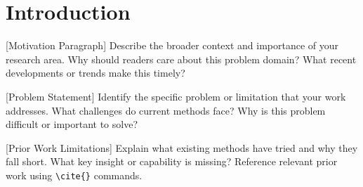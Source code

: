 \vspace{-15pt}
\section{Introduction}


[Motivation Paragraph] Describe the broader context and importance of your research area. Why should readers care about this problem domain? What recent developments or trends make this timely?


[Problem Statement] Identify the specific problem or limitation that your work addresses. What challenges do current methods face? Why is this problem difficult or important to solve?


[Prior Work Limitations] Explain what existing methods have tried and why they fall short. What key insight or capability is missing? Reference relevant prior work using \texttt{\textbackslash{}cite\{\}} commands.


